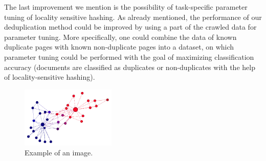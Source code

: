 \documentclass[9pt]{IEEEtran}
\begin{document}
The last improvement we mention is the possibility of task-specific parameter tuning of locality sensitive hashing.
As already mentioned, the performance of our deduplication method could be improved by using a part of the crawled data for parameter tuning.
More specifically, one could combine the data of known duplicate pages with known non-duplicate pages into a dataset, on which parameter tuning could be performed with the goal of maximizing classification accuracy (documents are classified as duplicates or non-duplicates with the help of locality-sensitive hashing).

\begin{figure}[h] \centering
    \includegraphics[width=0.4\textwidth]{karate.png}
    \caption{{Example of an image.}}
    \label{fig:karate}
\end{figure}


 






\end{document}
